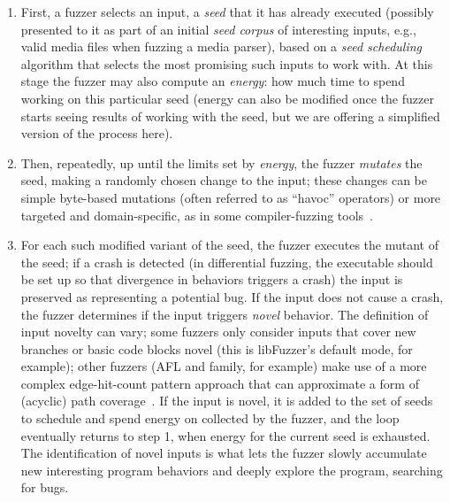 \begin{enumerate}
\item First, a fuzzer selects an input, a \emph{seed} that it has already executed
 (possibly presented to it as part of an initial \emph{seed corpus} of
  interesting inputs, e.g., valid media files when fuzzing a media
  parser), based on a \emph{seed scheduling} algorithm that selects
  the most promising such inputs to work with.  At this stage the
  fuzzer may also compute an \emph{energy}: how much time to spend
  working on this particular seed (energy can also be modified once
  the fuzzer starts seeing results of working with the seed, but we
  are offering a simplified version of the process here).
\item Then, repeatedly, up until the limits set by \emph{energy}, the
  fuzzer \emph{mutates} the seed, making a randomly chosen change to
  the input; these changes can be simple byte-based mutations (often
  referred to as ``havoc'' operators) or more targeted and
  domain-specific, as in some compiler-fuzzing tools~\cite{cc2022}.
\item For each such modified variant of the seed, the fuzzer executes
  the mutant of the seed; if a crash is detected (in differential
  fuzzing, the executable should be set up so that divergence in
  behaviors triggers a crash) the input is preserved as representing a
  potential bug.  If the input does not cause a crash, the fuzzer
  determines if the input triggers \emph{novel} behavior.  The
  definition of input novelty can vary; some fuzzers only consider inputs
  that cover new branches or basic code blocks novel (this is
  libFuzzer's default mode, for example); other fuzzers (AFL and
  family, for example) make use of a more complex edge-hit-count
  pattern approach that can approximate a form of (acyclic) path coverage~\cite{ISSTA13}.  If
  the input is novel, it is added to the set of seeds to schedule and
  spend energy on collected by the fuzzer, and the loop eventually
  returns to step 1, when energy for the current seed is exhausted.
  The identification of novel inputs is what lets the fuzzer slowly
  accumulate new interesting program behaviors and deeply explore the
  program, searching for bugs.
\end{enumerate}

